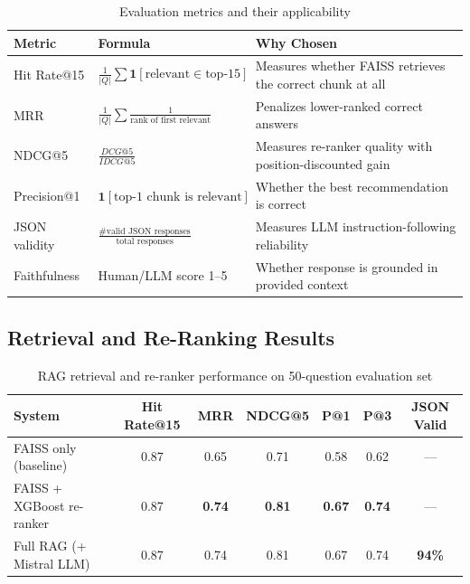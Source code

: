 \documentclass[12pt, letterpaper]{article}
\begin{document}
\begin{table}[H]
  \centering
  \caption{Evaluation metrics and their applicability}
  \label{tab:metrics}
  \begin{tabular}{lp{5cm}p{5cm}}
    \toprule
    \textbf{Metric} & \textbf{Formula} & \textbf{Why Chosen} \\
    \midrule
    Hit Rate@15 & $\frac{1}{|Q|}\sum \mathbf{1}[\text{relevant} \in \text{top-15}]$ & Measures whether FAISS retrieves the correct chunk at all \\
    MRR & $\frac{1}{|Q|}\sum \frac{1}{\text{rank of first relevant}}$ & Penalizes lower-ranked correct answers \\
    NDCG@5 & $\frac{DCG@5}{IDCG@5}$ & Measures re-ranker quality with position-discounted gain \\
    Precision@1 & $\mathbf{1}[\text{top-1 chunk is relevant}]$ & Whether the best recommendation is correct \\
    JSON validity & $\frac{\text{\# valid JSON responses}}{\text{total responses}}$ & Measures LLM instruction-following reliability \\
    Faithfulness & Human/LLM score 1--5 & Whether response is grounded in provided context \\
    \bottomrule
  \end{tabular}
\end{table}

\subsection{Retrieval and Re-Ranking Results}

\begin{table}[H]
  \centering
  \caption{RAG retrieval and re-ranker performance on 50-question evaluation set}
  \label{tab:results}
  \begin{tabular}{lcccccc}
    \toprule
    \textbf{System} & \textbf{Hit Rate@15} & \textbf{MRR} & \textbf{NDCG@5} & \textbf{P@1} & \textbf{P@3} & \textbf{JSON Valid} \\
    \midrule
    FAISS only (baseline)      & 0.87 & 0.65 & 0.71 & 0.58 & 0.62 & --- \\
    FAISS + XGBoost re-ranker  & 0.87 & \textbf{0.74} & \textbf{0.81} & \textbf{0.67} & \textbf{0.74} & --- \\
    Full RAG (+ Mistral LLM)   & 0.87 & 0.74 & 0.81 & 0.67 & 0.74 & \textbf{94\%} \\
    \bottomrule
  \end{tabular}
\end{table}
\end{document}
